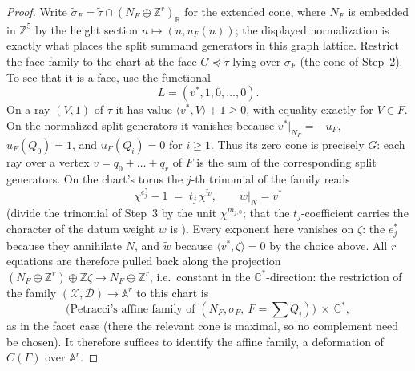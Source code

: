 \documentclass[11pt]{amsart}
\theoremstyle{definition}
\theoremstyle{remark}
\newcommand{\ZZ}{\mathbb{Z}}
\newcommand{\CC}{\mathbb{C}}
\newcommand{\RR}{\mathbb{R}}
\begin{document}
\begin{proof}
Write $\tilde\sigma_F = \tilde\tau \cap
(N_F\oplus\ZZ^r)_\RR$ for the extended cone, where $N_F$ is embedded in
$\ZZ^5$ by the height section $n \mapsto (n,u_F(n))$; the displayed
normalization is exactly what places the split summand generators in this
graph lattice.  Restrict the face family to the chart at the face
$G\preceq\tilde\tau$ lying over $\sigma_F$ (the cone of Step~2).  To see
that it is a face, use the functional
\[
 L=(v^\ast,1,0,\dots,0).
\]
On a ray $(V,1)$ of $\tau$ it has value
$\langle v^\ast,V\rangle+1\geq0$, with equality exactly for $V\in F$.
On the normalized split generators it vanishes because
$v^\ast|_{N_F}=-u_F$, $u_F(Q_0)=1$, and $u_F(Q_i)=0$ for $i\geq1$.
Thus its zero cone is precisely $G$: each ray over a vertex
$v=q_0+\dots+q_r$ of $F$ is the sum of the corresponding split
generators.  On the chart's torus the $j$-th trinomial of the family reads
\[
\chi^{e_j^\ast} - 1 \;=\; t_j\,\chi^{\tilde w},
\qquad \tilde w|_N = v^\ast
\]
(divide the trinomial of Step~3 by the unit $\chi^{m_{j,0}}$; that the
$t_j$-coefficient carries the character of the datum weight $w$ is
\cite[Thm.~3.5 and Rem.~3.7]{Petracci18}).  Every exponent here
vanishes on $\zeta$: the $e_j^\ast$ because they annihilate $N$, and
$\tilde w$ because $\langle v^\ast, \zeta\rangle = 0$ by the choice
above.  All $r$ equations are therefore pulled back along the projection
$(N_F \oplus \ZZ^r) \oplus \ZZ\zeta \to N_F \oplus \ZZ^r$, i.e.\
constant in the $\CC^\ast$-direction: the restriction of the family
$(\mathcal X,\mathcal D)\to\mathbb A^r$ to this chart is
\[
\bigl(\text{Petracci's affine family of }(N_F,\sigma_F,\ \textstyle F=\sum Q_i)\bigr)\ \times\ \CC^\ast ,
\]
as in the facet case \cite[Prop.~2.12]{CHP24} (there the relevant cone
is maximal, so no complement need be chosen).  It therefore suffices to
identify the affine family, a deformation of $C(F)$ over
$\mathbb A^r$.


\end{proof}
\end{document}
